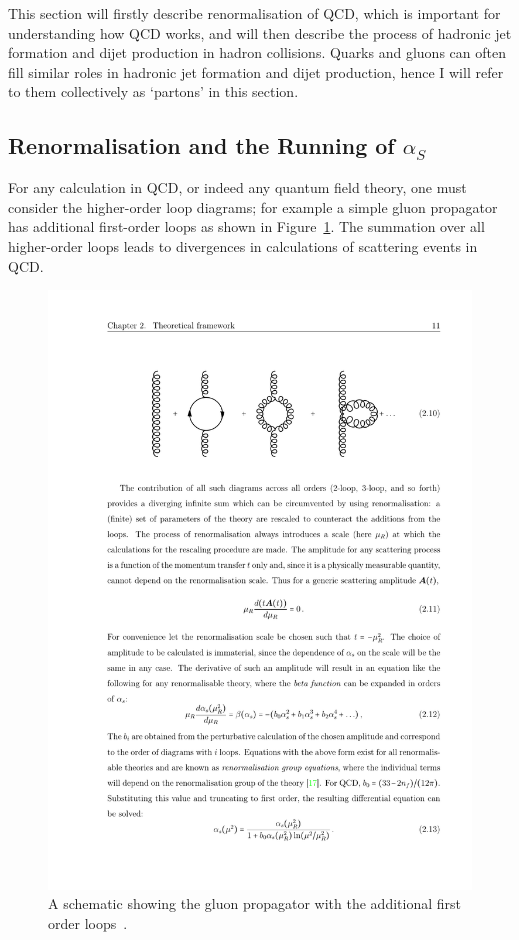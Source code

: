 This section will firstly describe renormalisation of QCD, which is important for understanding how QCD works,
and will then describe the process of hadronic jet formation and dijet production in hadron collisions.
Quarks and gluons can often fill similar roles in hadronic jet formation and dijet production, hence I will refer to them collectively as `partons' in this section.

\subsection{Renormalisation and the Running of $\alpha_S$}
\label{sec:theo-qcd_dijet_running}

For any calculation in QCD, or indeed any quantum field theory, one must consider the higher-order loop diagrams;
for example a simple gluon propagator has additional first-order loops as shown in Figure~\ref{fig:theo-qcd_gluon}.
The summation over all higher-order loops leads to divergences in calculations of scattering events in QCD.

\begin{figure}[!hbt]
  \begin{center}
    \includegraphics[width=0.5\linewidth, angle=0]{figs/Theory/qcd_gluon_loop.pdf}
  \end{center}
  \caption[A schematic showing the gluon propagator with the additional first order loops.]
  {A schematic showing the gluon propagator with the additional first order loops~\cite{det-thesis_kate}.}
  \label{fig:theo-qcd_gluon}
\end{figure}

